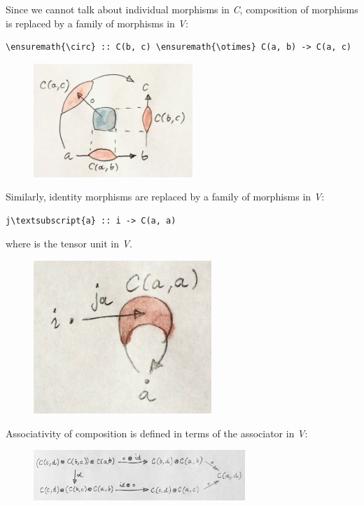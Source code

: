 Since we cannot talk about individual morphisms in \emph{C}, composition
of morphisms is replaced by a family of morphisms in \emph{V}:

\begin{Verbatim}[commandchars=\\\{\}]
 \ensuremath{\circ} :: C(b, c) \ensuremath{\otimes} C(a, b) -> C(a, c)
\end{Verbatim}

\begin{figure}[H]
\centering
\includegraphics[width=60mm]{images/composition.jpg}
\end{figure}

\noindent
Similarly, identity morphisms are replaced by a family of morphisms in
\emph{V}:

\begin{Verbatim}[commandchars=\\\{\}]
j\textsubscript{a} :: i -> C(a, a)
\end{Verbatim}
where  is the tensor unit in \emph{V}.

\begin{figure}[H]
\centering
\includegraphics[width=2.64583in]{images/id.jpg}
\end{figure}

\noindent
Associativity of composition is defined in terms of the associator in
\emph{V}:

\begin{figure}[H]
\centering
\includegraphics[width=80mm]{images/compcoherence.jpg}
\end{figure}

